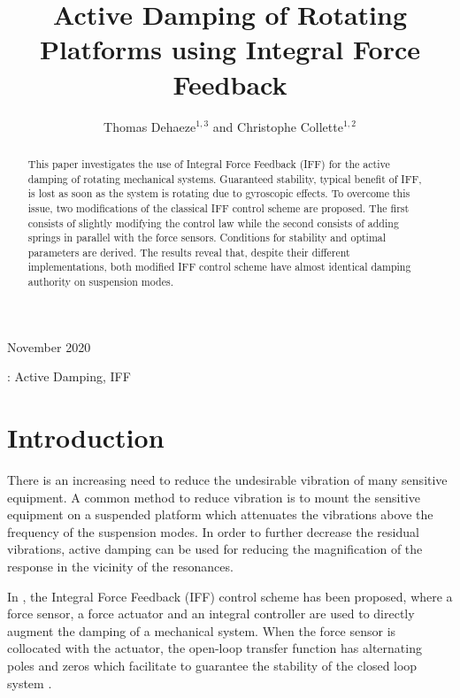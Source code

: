 \documentclass[10pt]{iopart}
\date{}
\begin{document}
\title{Active Damping of Rotating Platforms using Integral Force Feedback}
\author{Thomas Dehaeze$^{1,3}$ and Christophe Collette$^{1,2}$}
\address{$^1$ Precision Mechatronics Laboratory, University of Liege, Belgium}
\address{$^2$ BEAMS Department, Free University of Brussels, Belgium}
\address{$^3$ European Synchrotron Radiation Facility, Grenoble, France}

\vspace{10pt}
\begin{indented}
\item[]November 2020
\end{indented}

\begin{abstract}
This paper investigates the use of Integral Force Feedback (IFF) for the active damping of rotating mechanical systems.
Guaranteed stability, typical benefit of IFF, is lost as soon as the system is rotating due to gyroscopic effects.
To overcome this issue, two modifications of the classical IFF control scheme are proposed.
The first consists of slightly modifying the control law while the second consists of adding springs in parallel with the force sensors.
Conditions for stability and optimal parameters are derived.
The results reveal that, despite their different implementations, both modified IFF control scheme have almost identical damping authority on suspension modes.
\end{abstract}

\vspace{2pc}
: Active Damping, IFF

\ioptwocol

\section{Introduction}
\label{sec:org45302f3}
\label{sec:introduction}
There is an increasing need to reduce the undesirable vibration of many sensitive equipment.
A common method to reduce vibration is to mount the sensitive equipment on a suspended platform which attenuates the vibrations above the frequency of the suspension modes.
In order to further decrease the residual vibrations, active damping can be used for reducing the magnification of the response in the vicinity of the resonances.

In \cite{preumont92_activ_dampin_by_local_force}, the Integral Force Feedback (IFF) control scheme has been proposed, where a force sensor, a force actuator and an integral controller are used to directly augment the damping of a mechanical system.
When the force sensor is collocated with the actuator, the open-loop transfer function has alternating poles and zeros which facilitate to guarantee the stability of the closed loop system \cite{preumont02_force_feedb_versus_accel_feedb}.
\end{document}
